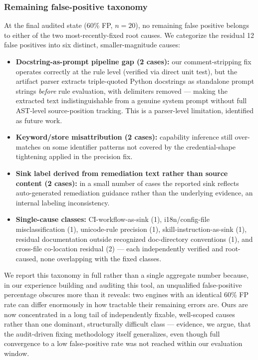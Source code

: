 \documentclass[sigconf,anonymous,review]{acmart}
\begin{document}
\subsubsection{Remaining false-positive taxonomy}
At the final audited state (60\% FP, $n{=}20$), no remaining false positive belongs to either of the two most-recently-fixed root causes. We categorize the residual 12 false positives into six distinct, smaller-magnitude causes:
\begin{itemize}
\item \textbf{Docstring-as-prompt pipeline gap (2 cases):} our comment-stripping fix operates correctly at the rule level (verified via direct unit test), but the artifact parser extracts triple-quoted Python docstrings as standalone prompt strings \emph{before} rule evaluation, with delimiters removed --- making the extracted text indistinguishable from a genuine system prompt without full AST-level source-position tracking. This is a parser-level limitation, identified as future work.
\item \textbf{Keyword/store misattribution (2 cases):} capability inference still over-matches on some identifier patterns not covered by the credential-shape tightening applied in the precision fix.
\item \textbf{Sink label derived from remediation text rather than source content (2 cases):} in a small number of cases the reported sink reflects auto-generated remediation guidance rather than the underlying evidence, an internal labeling inconsistency.
\item \textbf{Single-cause classes:} CI-workflow-as-sink (1), i18n/config-file misclassification (1), unicode-rule precision (1), skill-instruction-as-sink (1), residual documentation outside recognized doc-directory conventions (1), and cross-file co-location residual (2) --- each independently verified and root-caused, none overlapping with the fixed classes.
\end{itemize}
We report this taxonomy in full rather than a single aggregate number because, in our experience building and auditing this tool, an unqualified false-positive percentage obscures more than it reveals: two engines with an identical 60\% FP rate can differ enormously in how tractable their remaining errors are. Ours are now concentrated in a long tail of independently fixable, well-scoped causes rather than one dominant, structurally difficult class --- evidence, we argue, that the audit-driven fixing methodology itself generalizes, even though full convergence to a low false-positive rate was not reached within our evaluation window.
\end{document}
